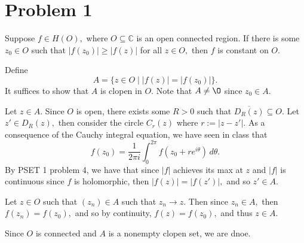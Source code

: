 \documentclass[11pt]{article}
\newcommand{\bbC}{\mathbb{C}}
\renewcommand{\emptyset}{\O}
\begin{document}
	
	\psetheader
\section*{Problem 1}
\begin{problem}
    Suppose $f \in H(O),$ where $O\subseteq \bbC$ is an open connected region. If there is some $z_0 \in O$ such that $|f(z_0)| \geq |f(z)|$ for all $z\in O,$ then $f$ is constant on $O.$
\end{problem}
\begin{solution}
Define 
\[A = \{z\in O \mid |f(z)|= |f(z_0)|\}.\] It suffices to show that $A$ is clopen in $O.$ Note that $A \neq \emptyset$ since $z_0 \in A.$

Let $z\in A.$ Since $O$ is open, there exists some $R>0$ such that $\overline{D_R(z)} \subseteq O.$ Let $z' \in D_R(z),$ then consider the circle $C_r(z)$ where $r:= |z -z'|.$ As a consequence of the Cauchy integral equation, we have seen in class that 
\[f(z_0) = \frac{1}{2\pi i}\int_0^{2\pi}f(z_0 + re^{i\theta})\,d\theta.\] By PSET 1 problem 4, we have that since $|f|$ achieves its max at $z$ and $|f|$ is continuous since $f$ is holomorphic, then $|f(z)| = |f(z')|,$ and so $z' \in A.$

Let $z \in O$ such that $(z_n) \in A$ such that $z_n \to z.$ Then since $z_n \in A,$ then $f(z_n) = f(z_0),$ and so by continuity, $f(z) = f(z_0),$ and thus $z \in A.$ 

Since $O$ is connected and $A$ is a nonempty clopen set, we are dnoe.

\end{solution}

\newpage
\end{document}
